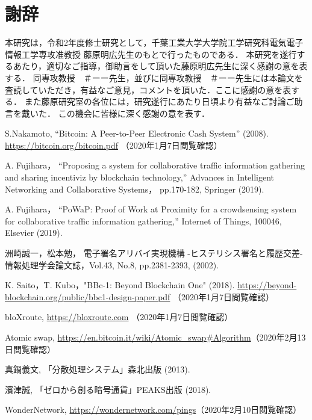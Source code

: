 \documentclass[a4paper,12pt]{jsarticle}
\begin{document}
\newpage
\section*{謝辞}

本研究は，令和2年度修士研究として，千葉工業大学大学院工学研究科電気電子情報工学専攻准教授 藤原明広先生のもとで行ったものである．
本研究を遂行するあたり，適切なご指導，御助言をして頂いた藤原明広先生に深く感謝の意を表する．
同専攻教授　＃ーー先生，並びに同専攻教授　＃ーー先生には本論文を査読していただき，有益なご意見，コメントを頂いた．ここに感謝の意を表する．
また藤原研究室の各位には，研究遂行にあたり日頃より有益なご討論ご助言を戴いた．
この機会に皆様に深く感謝の意を表す．

\newpage

\begin{thebibliography}{99}
S.Nakamoto,
``Bitcoin: A Peer-to-Peer Electronic Cash System'' (2008).
\url {https://bitcoin.org/bitcoin.pdf} （2020年1月7日閲覧確認）

A. Fujihara，
``Proposing a system for collaborative traffic information gathering 
and sharing incentiviz by blockchain technology,''
Advances in Intelligent Networking and Collaborative Systems，
pp.170-182, Springer (2019).

A. Fujihara，
``PoWaP: Proof of Work at Proximity for a crowdsensing system for 
collaborative traffic information gathering,'' 
Internet of Things, 100046, Elsevier (2019).

洲崎誠一，松本勉，
電子署名アリバイ実現機構 -ヒステリシス署名と履歴交差-
情報処理学会論文誌，Vol.43, No.8, pp.2381-2393, (2002).

K. Saito，T. Kubo，"BBc-1: Beyond Blockchain One" (2018).
\url{https://beyond-blockchain.org/public/bbc1-design-paper.pdf} （2020年1月7日閲覧確認）

bloXroute, \url{https://bloxroute.com} （2020年1月7日閲覧確認）

Atomic swap, \url{https://en.bitcoin.it/wiki/Atomic_swap#Algorithm}（2020年2月13日閲覧確認）

真鍋義文, 「分散処理システム」森北出版 (2013).

濱津誠, 「ゼロから創る暗号通貨」PEAKS出版 (2018).

WonderNetwork, \url{https://wondernetwork.com/pings}（2020年2月10日閲覧確認）


\end{thebibliography} 
\end{document}
